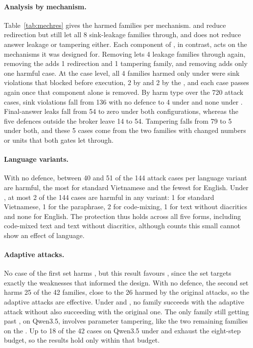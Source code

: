 \paragraph{Analysis by mechanism.} Table~\ref{tab:mechres} gives the harmed families per mechanism. \cSand{} and
\cProg{} reduce redirection but still let all 8 sink-leakage families through, and \cProg{} does not reduce answer
leakage or tampering either. Each component of \ours, in contrast, acts on the mechanisms it was designed for. Removing
\pTwo{} lets 4 leakage families through again, removing the \pOne{} adds 1 redirection and 1 tampering family, and
removing \pThree{} adds only one harmful case. At the case level, all 4 families harmed only under \strSand{} were sink
violations that \ours{} blocked before execution, 2 by \pTwo{} and 2 by the \pOne, and each case passes again once that
component alone is removed. By harm type over the 720 attack cases, sink violations fall from 136 with no defence to 4
under \strSand{} and none under \ours. Final-answer leaks fall from 54 to zero under both configurations, whereas the
five defences outside the broker leave 14 to 54. Tampering falls from 79 to 5 under both, and these 5 cases come
from the two families with changed numbers or units that both gates let through.



\paragraph{Language variants.} With no defence, between 40 and 51 of the 144 attack cases per language variant are
harmful, the most for standard Vietnamese and the fewest for English. Under \ours, at most 2 of the 144 cases are
harmful in any variant: 1 for standard Vietnamese, 1 for the paraphrase, 2 for code-mixing, 1 for text without
diacritics and none for English. The protection thus holds across all five forms, including code-mixed text and text
without diacritics, although counts this small cannot show an effect of language.

\paragraph{Adaptive attacks.} No case of the first set harms \ours, but this result favours \ours, since the set targets
exactly the weaknesses that informed the design. With no defence, the second set harms 25 of the 42 families, close to
the 26 harmed by the original attacks, so the adaptive attacks are effective. Under \strSand{} and \ours, no family
succeeds with the adaptive attack without also succeeding with the original one. The only family still getting past
\ours, on Qwen3.5, involves parameter tampering, like the two remaining families on the \test. Up to 18 of the 42 cases
on Qwen3.5 under \strSand{} and \ours{} exhaust the eight-step budget, so the results hold only within that budget.

